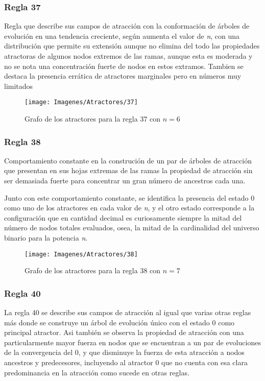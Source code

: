 \documentclass[]{article}
\begin{document}
			
			
			\newpage
			\subsubsection{Regla 37}
				\justifying
				Regla que describe sus campos de atracción con la conformación de árboles de evolución en una tendencia creciente, según aumenta el valor de \textit{n}, con una distribución que permite su extensión aunque no elimina del todo las propiedades atractoras de algunos nodos extremos de las ramas, aunque esta es moderada y no se nota una concentración fuerte de nodos en estos extramos. Tambien se destaca la presencia errática de atractores marginales pero en números muy limitados
				
				\hfill\break
				\hfill\break
				\begin{figure}[!h]
					\centering
					\texttt{[image: Imagenes/Atractores/37]}
					\caption{Grafo de los atractores para la regla 37 con $n=6$}
					\label{Regla_37}
				\end{figure}
			
			
			\newpage
			\subsubsection{Regla 38}
				\justifying
				Comportamiento constante en la construción de un par de árboles de atracción que presentan en sus hojas extremas de las ramas la propiedad de atracción sin ser demasiada fuerte para concentrar un gran número de ancestros cada una.
				
				\hfill\break
				\justifying
				Junto con este comportamiento constante, se identifica la presencia del estado 0 como uno de los atractores en cada valor de \textit{n}, y el otro estado corresponde a la configuración que en cantidad decimal es curiosamente siempre la mitad del número de nodos totales evaluados, osea, la mitad de la cardinalidad del universo binario para la potencia \textit{n}.
				
				\hfill\break
				\hfill\break
				\begin{figure}[!h]
					\centering
					\texttt{[image: Imagenes/Atractores/38]}
					\caption{Grafo de los atractores para la regla 38 con $n=7$}
					\label{Regla_38}
				\end{figure}
			
			\newpage
			\subsubsection{Regla 40}
				\justifying
				La regla 40 se describe sus campos de atracción al igual que varias otras reglas más donde se construye un árbol de evolución único con el estado 0 como principal atractor. Asi también se observa la propiedad de atracción con una particularmente mayor fuerza en nodos que se encuentran a un par de evoluciones de la convergencia del 0, y que disminuye la fuerza de esta atracción a nodos ancestros y predecesores, incluyendo al atractor 0 que no cuenta con esa clara predominancia en la atracción como sucede en otras reglas.
				
\end{document}
